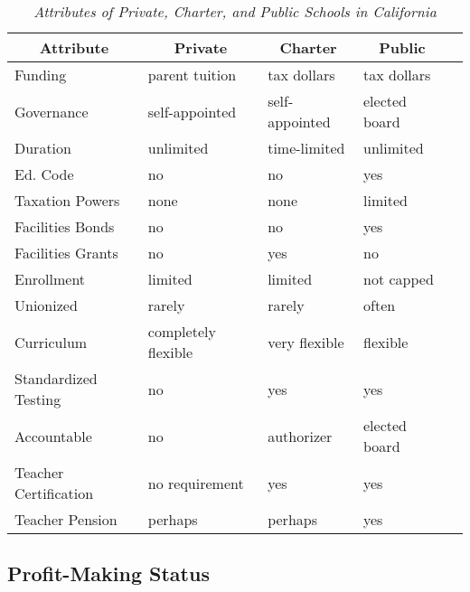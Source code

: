 \begin{table}[hbt]
  \caption[Attributes of Private, Charter, and Public Schools in California]{\textit{Attributes of Private, Charter, and Public Schools in California}}\label{tab:school_attributes}%
  \begin{tabular}{lllll}\toprule
\multicolumn{1}{c}{Attribute}  & \multicolumn{1}{c}{Private}    & \multicolumn{1}{c}{Charter} & \multicolumn{1}{c}{Public}  \\\midrule
    Funding               & parent tuition      & tax dollars      & tax dollars      \\
    Governance            & self-appointed      & self-appointed   & elected board    \\
    Duration              & unlimited           & time-limited     & unlimited        \\
    Ed. Code              & no                  & no               & yes              \\
    Taxation Powers       & none                & none             & limited          \\
    Facilities Bonds      & no                  & no               & yes              \\
    Facilities Grants     & no                  & yes              & no               \\
    Enrollment            & limited             & limited          & not capped       \\
    Unionized             & rarely              & rarely           & often            \\
    Curriculum            & completely flexible & very flexible    & flexible         \\
    Standardized Testing  & no                  & yes              & yes              \\
    Accountable           & no                  & authorizer       & elected board    \\
    Teacher Certification & no requirement      & yes              & yes              \\
    Teacher Pension       & perhaps             & perhaps          & yes              \\\bottomrule
  \end{tabular}
\end{table}

\subsection{Profit-Making Status}\indent

